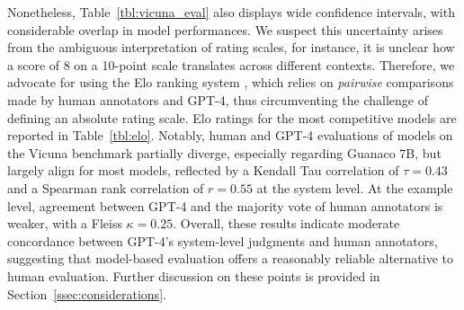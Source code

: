 Nonetheless, Table~\ref{tbl:vicuna_eval} also displays wide confidence intervals, with considerable overlap in model performances. We suspect this uncertainty arises from the ambiguous interpretation of rating scales, for instance, it is unclear how a score of 8 on a 10-point scale translates across different contexts. Therefore, we advocate for using the Elo ranking system \citep{elo1967proposed}, which relies on \textit{pairwise} comparisons made by human annotators and GPT-4, thus circumventing the challenge of defining an absolute rating scale. Elo ratings for the most competitive models are reported in Table~\ref{tbl:elo}. Notably, human and GPT-4 evaluations of models on the Vicuna benchmark partially diverge, especially regarding Guanaco 7B, but largely align for most models, reflected by a Kendall Tau correlation of $\tau=0.43$ and a Spearman rank correlation of $r=0.55$ at the system level. At the example level, agreement between GPT-4 and the majority vote of human annotators is weaker, with a Fleiss $\kappa=0.25$. Overall, these results indicate moderate concordance between GPT-4’s system-level judgments and human annotators, suggesting that model-based evaluation offers a reasonably reliable alternative to human evaluation. Further discussion on these points is provided in Section~\ref{ssec:considerations}.

